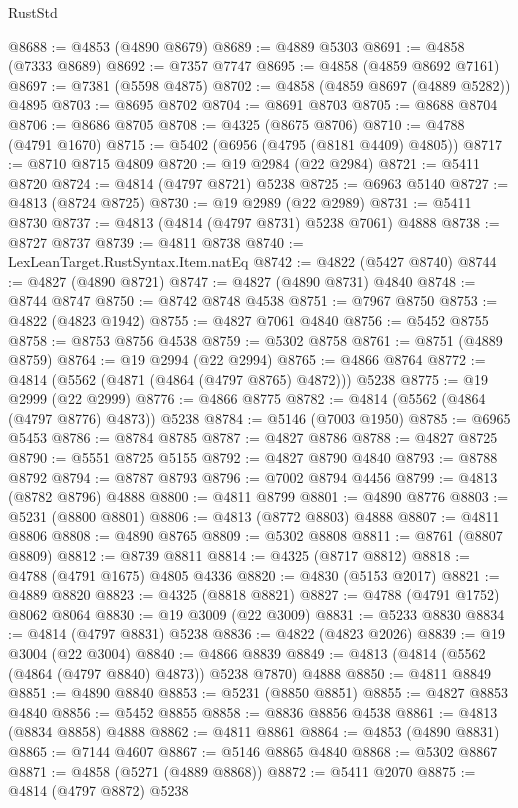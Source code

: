 \begin{lexlean}{RustStd}
\begin{coremodule}
@8688 := @4853 (@4890 @8679)
@8689 := @4889 @5303
@8691 := @4858 (@7333 @8689)
@8692 := @7357 @7747
@8695 := @4858 (@4859 @8692 @7161)
@8697 := @7381 (@5598 @4875)
@8702 := @4858 (@4859 @8697 (@4889 @5282)) @4895
@8703 := @8695 @8702
@8704 := @8691 @8703
@8705 := @8688 @8704
@8706 := @8686 @8705
@8708 := @4325 (@8675 @8706)
@8710 := @4788 (@4791 @1670)
@8715 := @5402 (@6956 (@4795 (@8181 @4409) @4805))
@8717 := @8710 @8715 @4809
@8720 := @19 @2984 (@22 @2984)
@8721 := @5411 @8720
@8724 := @4814 (@4797 @8721) @5238
@8725 := @6963 @5140
@8727 := @4813 (@8724 @8725)
@8730 := @19 @2989 (@22 @2989)
@8731 := @5411 @8730
@8737 := @4813 (@4814 (@4797 @8731) @5238 @7061) @4888
@8738 := @8727 @8737
@8739 := @4811 @8738
@8740 := LexLeanTarget.RustSyntax.Item.natEq
@8742 := @4822 (@5427 @8740)
@8744 := @4827 (@4890 @8721)
@8747 := @4827 (@4890 @8731) @4840
@8748 := @8744 @8747
@8750 := @8742 @8748 @4538
@8751 := @7967 @8750
@8753 := @4822 (@4823 @1942)
@8755 := @4827 @7061 @4840
@8756 := @5452 @8755
@8758 := @8753 @8756 @4538
@8759 := @5302 @8758
@8761 := @8751 (@4889 @8759)
@8764 := @19 @2994 (@22 @2994)
@8765 := @4866 @8764
@8772 := @4814 (@5562 (@4871 (@4864 (@4797 @8765) @4872))) @5238
@8775 := @19 @2999 (@22 @2999)
@8776 := @4866 @8775
@8782 := @4814 (@5562 (@4864 (@4797 @8776) @4873)) @5238
@8784 := @5146 (@7003 @1950)
@8785 := @6965 @5453
@8786 := @8784 @8785
@8787 := @4827 @8786
@8788 := @4827 @8725
@8790 := @5551 @8725 @5155
@8792 := @4827 @8790 @4840
@8793 := @8788 @8792
@8794 := @8787 @8793
@8796 := @7002 @8794 @4456
@8799 := @4813 (@8782 @8796) @4888
@8800 := @4811 @8799
@8801 := @4890 @8776
@8803 := @5231 (@8800 @8801)
@8806 := @4813 (@8772 @8803) @4888
@8807 := @4811 @8806
@8808 := @4890 @8765
@8809 := @5302 @8808
@8811 := @8761 (@8807 @8809)
@8812 := @8739 @8811
@8814 := @4325 (@8717 @8812)
@8818 := @4788 (@4791 @1675) @4805 @4336
@8820 := @4830 (@5153 @2017)
@8821 := @4889 @8820
@8823 := @4325 (@8818 @8821)
@8827 := @4788 (@4791 @1752) @8062 @8064
@8830 := @19 @3009 (@22 @3009)
@8831 := @5233 @8830
@8834 := @4814 (@4797 @8831) @5238
@8836 := @4822 (@4823 @2026)
@8839 := @19 @3004 (@22 @3004)
@8840 := @4866 @8839
@8849 := @4813 (@4814 (@5562 (@4864 (@4797 @8840) @4873)) @5238 @7870) @4888
@8850 := @4811 @8849
@8851 := @4890 @8840
@8853 := @5231 (@8850 @8851)
@8855 := @4827 @8853 @4840
@8856 := @5452 @8855
@8858 := @8836 @8856 @4538
@8861 := @4813 (@8834 @8858) @4888
@8862 := @4811 @8861
@8864 := @4853 (@4890 @8831)
@8865 := @7144 @4607
@8867 := @5146 @8865 @4840
@8868 := @5302 @8867
@8871 := @4858 (@5271 (@4889 @8868))
@8872 := @5411 @2070
@8875 := @4814 (@4797 @8872) @5238

\end{coremodule}
\end{lexlean}
